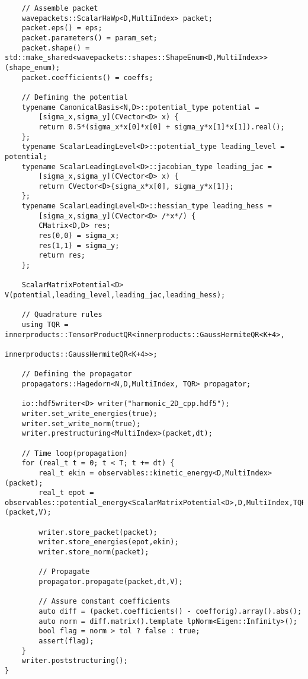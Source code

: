 \begin{lstlisting}
    // Assemble packet
    wavepackets::ScalarHaWp<D,MultiIndex> packet;
    packet.eps() = eps;
    packet.parameters() = param_set;
    packet.shape() = std::make_shared<wavepackets::shapes::ShapeEnum<D,MultiIndex>>(shape_enum);
    packet.coefficients() = coeffs;

    // Defining the potential
    typename CanonicalBasis<N,D>::potential_type potential =
        [sigma_x,sigma_y](CVector<D> x) {
        return 0.5*(sigma_x*x[0]*x[0] + sigma_y*x[1]*x[1]).real();
    };
    typename ScalarLeadingLevel<D>::potential_type leading_level = potential;
    typename ScalarLeadingLevel<D>::jacobian_type leading_jac =
        [sigma_x,sigma_y](CVector<D> x) {
        return CVector<D>{sigma_x*x[0], sigma_y*x[1]};
    };
    typename ScalarLeadingLevel<D>::hessian_type leading_hess =
        [sigma_x,sigma_y](CVector<D> /*x*/) {
        CMatrix<D,D> res;
        res(0,0) = sigma_x;
        res(1,1) = sigma_y;
        return res;
    };

    ScalarMatrixPotential<D> V(potential,leading_level,leading_jac,leading_hess);

    // Quadrature rules
    using TQR = innerproducts::TensorProductQR<innerproducts::GaussHermiteQR<K+4>,
                                               innerproducts::GaussHermiteQR<K+4>>;

    // Defining the propagator
    propagators::Hagedorn<N,D,MultiIndex, TQR> propagator;

    io::hdf5writer<D> writer("harmonic_2D_cpp.hdf5");
    writer.set_write_energies(true);
    writer.set_write_norm(true);
    writer.prestructuring<MultiIndex>(packet,dt);

    // Time loop(propagation)
    for (real_t t = 0; t < T; t += dt) {
    	real_t ekin = observables::kinetic_energy<D,MultiIndex>(packet);
        real_t epot = observables::potential_energy<ScalarMatrixPotential<D>,D,MultiIndex,TQR>(packet,V);

        writer.store_packet(packet);
        writer.store_energies(epot,ekin);
        writer.store_norm(packet);
    	
        // Propagate
        propagator.propagate(packet,dt,V);

        // Assure constant coefficients
        auto diff = (packet.coefficients() - coefforig).array().abs();
        auto norm = diff.matrix().template lpNorm<Eigen::Infinity>();
        bool flag = norm > tol ? false : true;
        assert(flag);
    }
    writer.poststructuring();
}
\end{lstlisting}
